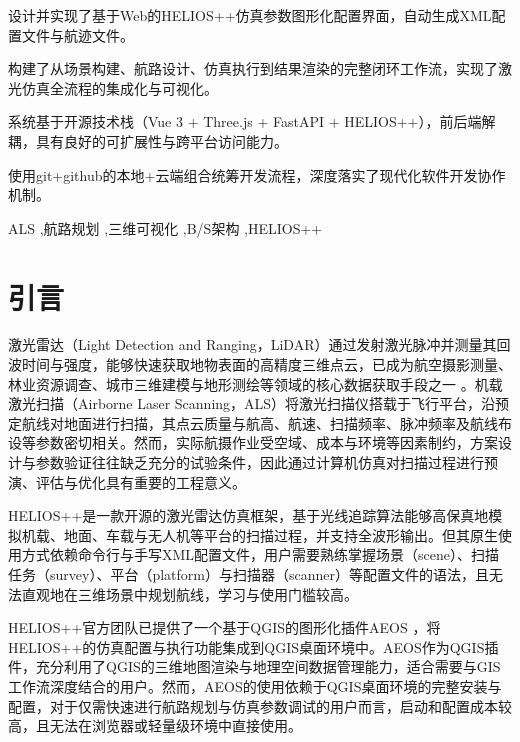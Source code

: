 \documentclass[a4paper,fleqn]{cas-sc}
\begin{document}
\begin{graphicalabstract}
\end{graphicalabstract}

\begin{highlights}
  \item 设计并实现了基于Web的HELIOS++仿真参数图形化配置界面，自动生成XML配置文件与航迹文件。
  \item 构建了从场景构建、航路设计、仿真执行到结果渲染的完整闭环工作流，实现了激光仿真全流程的集成化与可视化。
  \item 系统基于开源技术栈（Vue 3 + Three.js + FastAPI + HELIOS++），前后端解耦，具有良好的可扩展性与跨平台访问能力。
  \item 使用git+github的本地+云端组合统筹开发流程，深度落实了现代化软件开发协作机制。
\end{highlights}

\begin{keywords}
  ALS \sep 航路规划 \sep 三维可视化 \sep B/S架构 \sep HELIOS++
\end{keywords}

\MakeNJFUTitlePage[UseDocTitle]
\maketitle
\tableofcontents
\hrulefill

\section{引言}
激光雷达（Light Detection and Ranging，LiDAR）通过发射激光脉冲并测量其回波时间与强度，能够快速获取地物表面的高精度三维点云，已成为航空摄影测量、林业资源调查、城市三维建模与地形测绘等领域的核心数据获取手段之一 \citep{laserRemoteSensing}。机载激光扫描（Airborne Laser Scanning，ALS）将激光扫描仪搭载于飞行平台，沿预定航线对地面进行扫描，其点云质量与航高、航速、扫描频率、脉冲频率及航线布设等参数密切相关。然而，实际航摄作业受空域、成本与环境等因素制约，方案设计与参数验证往往缺乏充分的试验条件，因此通过计算机仿真对扫描过程进行预演、评估与优化具有重要的工程意义。

HELIOS++是一款开源的激光雷达仿真框架，基于光线追踪算法能够高保真地模拟机载、地面、车载与无人机等平台的扫描过程，并支持全波形输出。但其原生使用方式依赖命令行与手写XML配置文件，用户需要熟练掌握场景（scene）、扫描任务（survey）、平台（platform）与扫描器（scanner）等配置文件的语法，且无法直观地在三维场景中规划航线，学习与使用门槛较高。

HELIOS++官方团队已提供了一个基于QGIS的图形化插件AEOS \citep{aeos}，将HELIOS++的仿真配置与执行功能集成到QGIS桌面环境中。AEOS作为QGIS插件，充分利用了QGIS的三维地图渲染与地理空间数据管理能力，适合需要与GIS工作流深度结合的用户。然而，AEOS的使用依赖于QGIS桌面环境的完整安装与配置，对于仅需快速进行航路规划与仿真参数调试的用户而言，启动和配置成本较高，且无法在浏览器或轻量级环境中直接使用。
\end{document}
